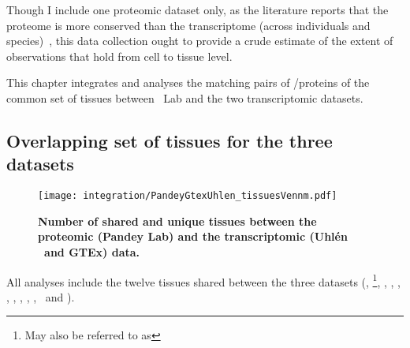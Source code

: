 
Though I include one proteomic dataset only,
as the literature reports that
the proteome is more conserved than the transcriptome
(across individuals and species)~,
this data collection ought to provide
a crude estimate of the extent of observations
that hold from cell to tissue level.

This chapter integrates and analyses the matching pairs of \mRNA/proteins
of the common set of tissues between \pandey\ Lab
and the two transcriptomic datasets.\mybr\

\subsection{Overlapping set of tissues for the three datasets}

\begin{figure}[!htbp]
    \texttt{[image: integration/PandeyGtexUhlen\_tissuesVennm.pdf]}
    \centering
    \vspace{-5mm}
    \caption[Number of shared and unique tissues between the proteomic
    dataset from Pandey Lab and the transcriptomic datasets (Uhlén \etal\ and
    Gtex)]{\label{fig:VennTissuePandeyGtexUhlen}\textbf{Number of shared and unique
    tissues between the proteomic (Pandey Lab) and the
    transcriptomic (Uhlén \etal\ and GTEx) data.} %
    }
\end{figure}

All analyses include the twelve tissues shared between the three
datasets (\adrenal, \Bladder{}\footnote{May also
be referred to as },
\hColon, \Oesophagus, \Heart,
\Kidney, \Liver, \Lung, \Ovary, \Pancreas,
\Prostate\ and \Testis).

